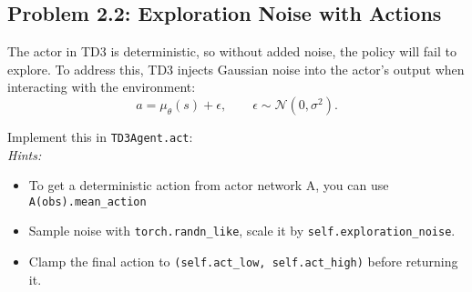 \documentclass[12pt]{article}
\begin{document}
\subsection*{Problem 2.2: Exploration Noise with Actions}

The actor in TD3 is deterministic, so without added noise, the policy will fail to explore. To address this, TD3 injects Gaussian noise into the actor’s output when interacting with the environment:
\[
a = \mu_\theta(s) + \epsilon, \qquad \epsilon \sim \mathcal{N}(0, \sigma^2).
\]


\noindent Implement this in \texttt{TD3Agent.act}: \\
\textit{Hints:}
\begin{itemize}
    \item To get a deterministic action from actor network A, you can use \texttt{A(obs).mean_action}
    \item Sample noise with \texttt{torch.randn\_like}, scale it by \texttt{self.exploration\_noise}.
    \item Clamp the final action to \texttt{(self.act\_low, self.act\_high)} before returning it.
\end{itemize}

\end{document}
